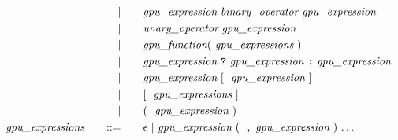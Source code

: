 \begin{alignat*}{9}
    &&  && |    &\quad &&  \textit{gpu\_expression} \ \textit{binary\_operator} \ \textit{gpu\_expression} \\
    &&  && |    &\quad &&  \textit{unary\_operator} \ \textit{gpu\_expression} \\
    &&  && |    &\quad &&  \textit{gpu\_function} ( \  \textit{gpu\_expressions} \ ) \\
    &&  && |    &\quad &&  \textit{gpu\_expression} \ \textbf{\texttt{?}} \ \textit{gpu\_expression} \ \textbf{\texttt{:}} \ \textit{gpu\_expression} \\
    &&  && |    &\quad &&  \textit{gpu\_expression} \ [ \ \ \textit{gpu\_expression} \ ] \ \\
    &&  && |    &\quad && [ \ \ \textit{gpu\_expressions} \ ] \ \\
    &&  && |    &\quad && ( \ \ \textit{gpu\_expression} \ ) \ \\
    && \textit{gpu\_expressions} 
    &&\quad ::= &\quad 
    && \epsilon \ | \ \textit{gpu\_expression} \ ( \ \ , \ \textit{gpu\_expression} \ )
    \ {\ldots}
    \end{alignat*}
    